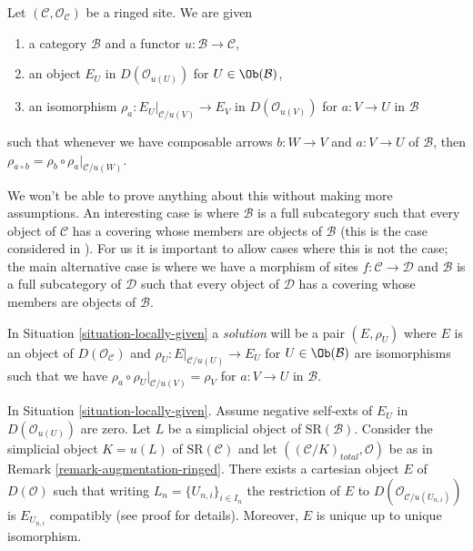 \begin{situation}
\label{situation-locally-given}
Let $(\mathcal{C}, \mathcal{O}_\mathcal{C})$ be a ringed site. We are given
\begin{enumerate}
\item a category $\mathcal{B}$ and a functor
$u : \mathcal{B} \to \mathcal{C}$,
\item an object $E_U$ in $D(\mathcal{O}_{u(U)})$ for $U \in \Ob(\mathcal{B})$,
\item an isomorphism $\rho_a : E_U|_{\mathcal{C}/u(V)} \to E_V$ in
$D(\mathcal{O}_{u(V)})$ for $a : V \to U$ in $\mathcal{B}$
\end{enumerate}
such that whenever we have composable arrows
$b : W \to V$ and $a : V \to U$ of $\mathcal{B}$, then
$\rho_{a \circ b} = \rho_b \circ \rho_a|_{\mathcal{C}/u(W)}$.
\end{situation}

\noindent
We won't be able to prove anything about this without making more
assumptions. An interesting case is where $\mathcal{B}$ is a full
subcategory such that every object of $\mathcal{C}$ has a covering
whose members are objects of $\mathcal{B}$ (this is the case considered
in \cite{BBD}). For us it is important to allow cases where this is not
the case; the main alternative case is where we have a morphism
of sites $f : \mathcal{C} \to \mathcal{D}$ and $\mathcal{B}$
is a full subcategory of $\mathcal{D}$ such that every object of
$\mathcal{D}$ has a covering whose members are objects of $\mathcal{B}$.

\medskip\noindent
In Situation \ref{situation-locally-given} a {\it solution}
will be a pair $(E, \rho_U)$ where $E$ is an object of
$D(\mathcal{O}_\mathcal{C})$
and $\rho_U : E|_{\mathcal{C}/u(U)} \to E_U$
for $U \in \Ob(\mathcal{B})$
are isomorphisms such that
we have $\rho_a \circ \rho_U|_{\mathcal{C}/u(V)} = \rho_V$
for $a : V \to U$ in $\mathcal{B}$.

\begin{lemma}
\label{lemma-prepare-bbd-glueing}
In Situation \ref{situation-locally-given}.
Assume negative self-exts of $E_U$ in $D(\mathcal{O}_{u(U)})$ are zero.
Let $L$ be a simplicial object of $\text{SR}(\mathcal{B})$.
Consider the simplicial object $K = u(L)$ of $\text{SR}(\mathcal{C})$
and let $((\mathcal{C}/K)_{total}, \mathcal{O})$ be as in
Remark \ref{remark-augmentation-ringed}.
There exists a cartesian object $E$ of $D(\mathcal{O})$
such that writing $L_n = \{U_{n, i}\}_{i \in I_n}$
the restriction of $E$ to $D(\mathcal{O}_{\mathcal{C}/u(U_{n, i})})$
is $E_{U_{n, i}}$ compatibly (see proof for details).
Moreover, $E$ is unique up to unique isomorphism.
\end{lemma}

